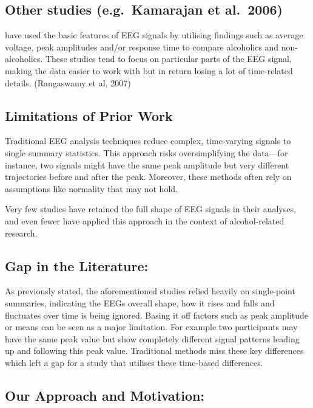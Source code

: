 \documentclass{article}
\begin{document}
\subsection{Other studies (e.g.~Kamarajan et
al.~2006)}\label{other-studies-e.g.-kamarajan-et-al.-2006}

have used the basic features of EEG signals by utilising findings such
as average voltage, peak amplitudes and/or response time to compare
alcoholics and non-alcoholics. These studies tend to focus on particular
parts of the EEG signal, making the data easier to work with but in
return losing a lot of time-related details. (Rangaswamy et al, 2007)

\subsection{Limitations of Prior Work}\label{limitations-of-prior-work}

Traditional EEG analysis techniques reduce complex, time-varying signals
to single summary statistics. This approach risks oversimplifying the
data---for instance, two signals might have the same peak amplitude but
very different trajectories before and after the peak. Moreover, these
methods often rely on assumptions like normality that may not hold.

Very few studies have retained the full shape of EEG signals in their
analyses, and even fewer have applied this approach in the context of
alcohol-related research.

\subsection{Gap in the Literature:}\label{gap-in-the-literature}

As previously stated, the aforementioned studies relied heavily on
single-point summaries, indicating the EEGs overall shape, how it rises
and falls and fluctuates over time is being ignored. Basing it off
factors such as peak amplitude or means can be seen as a major
limitation. For example two participants may have the same peak value
but show completely different signal patterns leading up and following
this peak value. Traditional methods miss these key differences which
left a gap for a study that utilises these time-based differences.

\subsection{Our Approach and
Motivation:}\label{our-approach-and-motivation}
\end{document}
